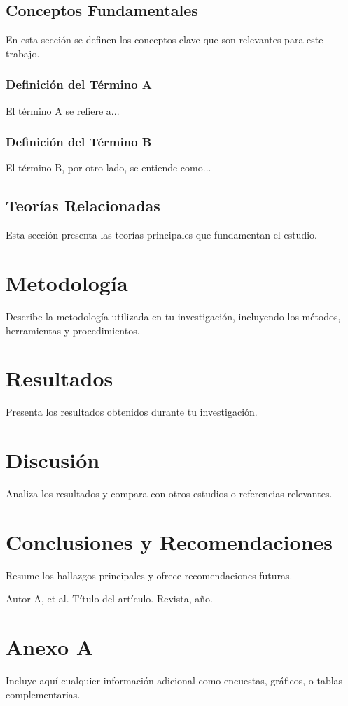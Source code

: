\documentclass[12pt]{report}
\begin{document}
\section{Conceptos Fundamentales}
En esta sección se definen los conceptos clave que son relevantes para este trabajo. 

\subsection{Definición del Término A}
El término A se refiere a...

\subsection{Definición del Término B}
El término B, por otro lado, se entiende como...

\section{Teorías Relacionadas}
Esta sección presenta las teorías principales que fundamentan el estudio.
\chapter{Metodología}
Describe la metodología utilizada en tu investigación, incluyendo los métodos, herramientas y procedimientos.

\chapter{Resultados}
Presenta los resultados obtenidos durante tu investigación.

\chapter{Discusión}
Analiza los resultados y compara con otros estudios o referencias relevantes.

\chapter{Conclusiones y Recomendaciones}
Resume los hallazgos principales y ofrece recomendaciones futuras.


\begin{thebibliography}{9}
	 Autor A, et al. Título del artículo. Revista, año.
\end{thebibliography}


\appendix
\chapter{Anexo A}
Incluye aquí cualquier información adicional como encuestas, gráficos, o tablas complementarias.
\end{document}
